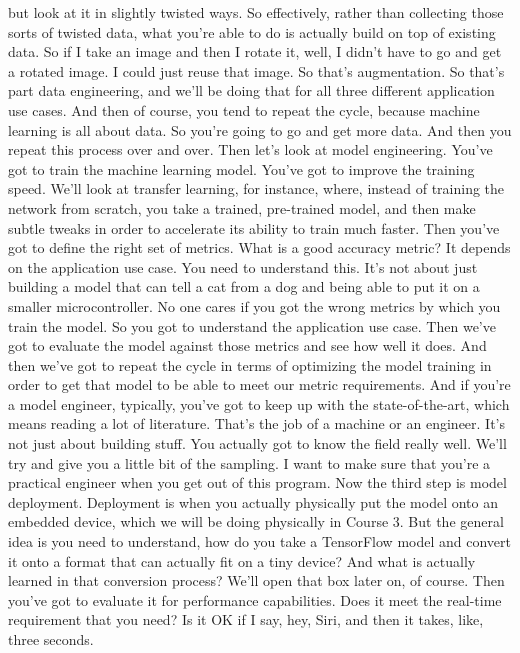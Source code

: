 but look at it in slightly twisted ways.
So effectively, rather than collecting those sorts
of twisted data, what you're able to do is actually
build on top of existing data.
So if I take an image and then I rotate it,
well, I didn't have to go and get a rotated image.
I could just reuse that image.
So that's augmentation.
So that's part data engineering, and we'll
be doing that for all three different application use cases.
And then of course, you tend to repeat the cycle,
because machine learning is all about data.
So you're going to go and get more data.
And then you repeat this process over and over.
Then let's look at model engineering.
You've got to train the machine learning model.
You've got to improve the training speed.
We'll look at transfer learning, for instance, where,
instead of training the network from scratch,
you take a trained, pre-trained model, and then
make subtle tweaks in order to accelerate its ability
to train much faster.
Then you've got to define the right set of metrics.
What is a good accuracy metric?
It depends on the application use case.
You need to understand this.
It's not about just building a model that can tell a cat from a dog
and being able to put it on a smaller microcontroller.
No one cares if you got the wrong metrics by which you train the model.
So you got to understand the application use case.
Then we've got to evaluate the model against those metrics
and see how well it does.
And then we've got to repeat the cycle in terms of optimizing the model
training in order to get that model to be
able to meet our metric requirements.
And if you're a model engineer, typically,
you've got to keep up with the state-of-the-art,
which means reading a lot of literature.
That's the job of a machine or an engineer.
It's not just about building stuff.
You actually got to know the field really well.
We'll try and give you a little bit of the sampling.
I want to make sure that you're a practical engineer when you get out
of this program.
Now the third step is model deployment.
Deployment is when you actually physically
put the model onto an embedded device, which we
will be doing physically in Course 3.
But the general idea is you need to understand, how do you
take a TensorFlow model and convert it onto a format that can actually
fit on a tiny device?
And what is actually learned in that conversion process?
We'll open that box later on, of course.
Then you've got to evaluate it for performance capabilities.
Does it meet the real-time requirement that you need?
Is it OK if I say, hey, Siri, and then it takes, like, three seconds.
